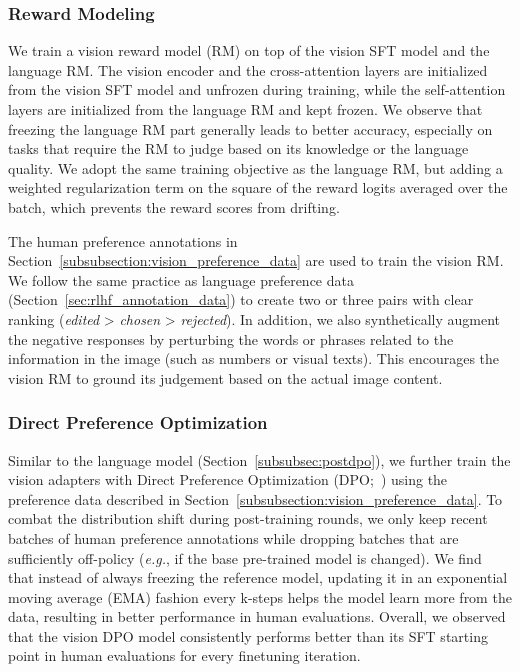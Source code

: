 \subsubsection{Reward Modeling}
\label{subsubsection:vision_reward_modeling}
We train a vision reward model (RM) on top of the vision SFT model and the language RM. The vision encoder and the cross-attention layers are initialized from the vision SFT model and unfrozen during training, while the self-attention layers are initialized from the language RM and kept frozen. We observe that freezing the language RM part generally leads to better accuracy, especially on tasks that require the RM to judge based on its knowledge or the language quality. We adopt the same training objective as the language RM, but adding a weighted regularization term on the square of the reward logits averaged over the batch, which prevents the reward scores from drifting.

The human preference annotations in Section~\ref{subsubsection:vision_preference_data} are used to train the vision RM. We follow the same practice as language preference data (Section~\ref{sec:rlhf_annotation_data}) to create two or three pairs with clear ranking (\emph{edited} > \emph{chosen} > \emph{rejected}). In addition, we also synthetically augment the negative responses by perturbing the words or phrases related to the information in the image (such as numbers or visual texts). This encourages the vision RM to ground its judgement based on the actual image content.

\subsubsection{Direct Preference Optimization}
\label{subsubsec:dpo}
Similar to the language model (Section~\ref{subsubsec:postdpo}), we further train the vision adapters with Direct Preference Optimization (DPO;~\cite{rafailov2023dpo}) using the preference data described in Section~\ref{subsubsection:vision_preference_data}. To combat the distribution shift during post-training rounds, we only keep recent batches of human preference annotations while dropping batches that are sufficiently off-policy (\textit{e.g.}, if the base pre-trained model is changed). We find that instead of always freezing the reference model, updating it in an exponential moving average (EMA) fashion every k-steps helps the model learn more from the data, resulting in better performance in human evaluations. Overall, we observed that the vision DPO model consistently performs better than its SFT starting point in human evaluations for every finetuning iteration.

